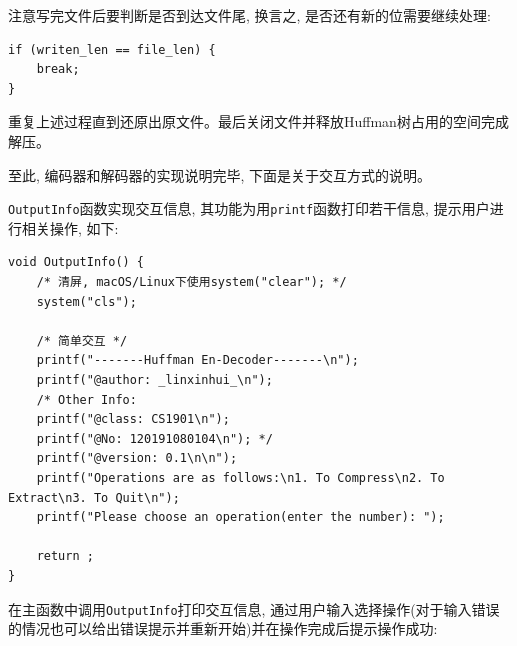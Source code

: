 \documentclass{ctexart}
\begin{document}
注意写完文件后要判断是否到达文件尾, 换言之, 是否还有新的位需要继续处理:

{\setmainfont{Courier New Bold}              
\begin{lstlisting}
if (writen_len == file_len) {
    break;
}
\end{lstlisting}}

重复上述过程直到还原出原文件。最后关闭文件并释放Huffman树占用的空间完成解压。

至此, 编码器和解码器的实现说明完毕, 下面是关于交互方式的说明。

\texttt{OutputInfo}函数实现交互信息, 其功能为用\texttt{printf}函数打印若干信息, 提示用户进行相关操作, 如下:

{\setmainfont{Courier New Bold}              
\begin{lstlisting}
void OutputInfo() {
    /* 清屏, macOS/Linux下使用system("clear"); */
    system("cls");

    /* 简单交互 */
    printf("-------Huffman En-Decoder-------\n");
    printf("@author: _linxinhui_\n");
    /* Other Info:
    printf("@class: CS1901\n");
    printf("@No: 120191080104\n"); */
    printf("@version: 0.1\n\n");
    printf("Operations are as follows:\n1. To Compress\n2. To Extract\n3. To Quit\n");
    printf("Please choose an operation(enter the number): ");

    return ;
}
\end{lstlisting}}

在主函数中调用\texttt{OutputInfo}打印交互信息, 通过用户输入选择操作(对于输入错误的情况也可以给出错误提示并重新开始)并在操作完成后提示操作成功:
\end{document}
